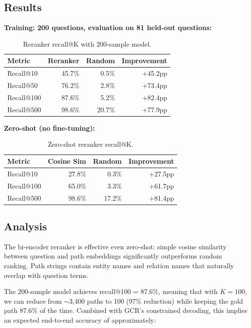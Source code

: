 \documentclass[11pt,twoside]{article}
\begin{document}
\subsection{Results}

\textbf{Training: 200 questions, evaluation on 81 held-out questions:}

\begin{table}[H]
  \centering
  \caption{Reranker recall@K with 200-sample model.}
  \label{tab:reranker}
  \begin{tabular}{lrrr}
    \toprule
    \textbf{Metric} & \textbf{Reranker} & \textbf{Random} & \textbf{Improvement} \\
    \midrule
    Recall@10 & 45.7\% & 0.5\% & +45.2pp \\
    Recall@50 & 76.2\% & 2.8\% & +73.4pp \\
    Recall@100 & 87.6\% & 5.2\% & +82.4pp \\
    Recall@500 & 98.6\% & 20.7\% & +77.9pp \\
    \bottomrule
  \end{tabular}
\end{table}

\textbf{Zero-shot (no fine-tuning):}

\begin{table}[H]
  \centering
  \caption{Zero-shot reranker recall@K.}
  \label{tab:zeroshot}
  \begin{tabular}{lrrr}
    \toprule
    \textbf{Metric} & \textbf{Cosine Sim} & \textbf{Random} & \textbf{Improvement} \\
    \midrule
    Recall@10 & 27.8\% & 0.3\% & +27.5pp \\
    Recall@100 & 65.0\% & 3.3\% & +61.7pp \\
    Recall@500 & 98.6\% & 17.2\% & +81.4pp \\
    \bottomrule
  \end{tabular}
\end{table}

\subsection{Analysis}

The bi-encoder reranker is effective even zero-shot: simple cosine similarity
between question and path embeddings significantly outperforms random ranking.
Path strings contain entity names and relation names that naturally overlap with
question terms.

The 200-sample model achieves recall@100 = 87.6\%, meaning that with \(K=100\),
we can reduce from \(\sim\)3,400 paths to 100 (97\% reduction) while keeping the
gold path 87.6\% of the time. Combined with GCR's constrained decoding, this
implies an expected end-to-end accuracy of approximately:
\end{document}
